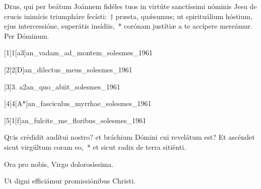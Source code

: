 \documentclass[vesperale_romanum.tex]{subfiles}
\begin{document}

\semiduplexmtv

\similabo

\oratio

\lettrine{D}{e}us, qui per beátum Joánnem fidéles tuos in virtúte sanctíssimi nóminis Jesu de crucis inimícis triumpháre fecísti:~† præsta, quǽsumus; ut spirituálium hóstium, ejus intercessióne, superátis insídiis,~* corónam justítiæ a te accípere mereámur. Per Dóminum.

\commferiae

\myrule

\vspace{0.25\baselineskip}


\duplexmajus


[1]{1}[a3]{an_vadam_ad_montem_solesmes_1961}

[2]{2}[D]{an_dilectus_meus_solesmes_1961}

[3]{3. a2}{an_quo_abiit_solesmes_1961}

[4]{4}[A*]{an_fasciculus_myrrhae_solesmes_1961}

[5]{1}[f]{an_fulcite_me_floribus_solesmes_1961}


\lettrine{Q}{u}is crédidit audítui nostro? et bráchium Dómini cui revelátum est? Et ascéndet sicut virgúltum coram eo,~* et sicut radix de terra sitiénti.

\hymnus


\vv Ora pro nobis, Virgo dolorosíssima.

\rr Ut digni efficiámur promissiónibus Christi.

\end{document}
